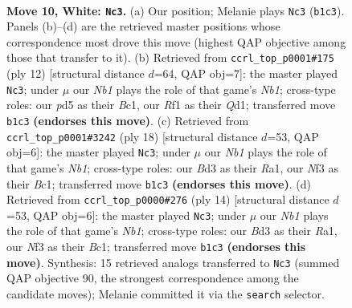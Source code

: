 \documentclass[11pt]{article}
\begin{document}
\clearpage

\begin{figure}[p]\centering
\begin{subfigure}{0.46\textwidth}\centering
\resizebox{\linewidth}{!}{%
\newchessgame
\chessboard[
  setfen={rnbq1rk1/pp3pp1/4pn2/3p3p/3P4/3B1NP1/PPP2PP1/RN1Q1RK1 w - - 0 10},
  showmover=false,
  pgfstyle=straightmove, color=movearrow, markmove={b1-c3}
]}
\caption{}
\end{subfigure}\hfill
\begin{subfigure}{0.46\textwidth}\centering
\resizebox{\linewidth}{!}{%
\newchessgame
\chessboard[
  setfen={rnbqk2r/pp2ppbp/5np1/3p4/3P4/5NP1/PP2PPBP/RNBQK2R w KQkq - 0 7},
  showmover=false,
  pgfstyle=straightmove, color=movearrow, markmove={b1-c3}
]}
\caption{}
\end{subfigure}
\\[4pt]
\begin{subfigure}{0.46\textwidth}\centering
\resizebox{\linewidth}{!}{%
\newchessgame
\chessboard[
  setfen={rnbq1rk1/pp2ppbp/5np1/3p4/3P4/5NP1/PP2PPBP/RNBQ1RK1 w - - 4 10},
  showmover=false,
  pgfstyle=straightmove, color=movearrow, markmove={b1-c3}
]}
\caption{}
\end{subfigure}\hfill
\begin{subfigure}{0.46\textwidth}\centering
\resizebox{\linewidth}{!}{%
\newchessgame
\chessboard[
  setfen={rnbq1rk1/pp2ppbp/5np1/3p4/3P4/5NP1/PP2PPBP/RNBQ1RK1 w - - 0 8},
  showmover=false,
  pgfstyle=straightmove, color=movearrow, markmove={b1-c3}
]}
\caption{}
\end{subfigure}
\caption{\textbf{Move 10, White: \texttt{Nc3}.} (a) Our position; Melanie plays \texttt{Nc3} (\texttt{b1c3}). Panels (b)--(d) are the retrieved master positions whose correspondence most drove this move (highest QAP objective among those that transfer to it). (b) Retrieved from \texttt{ccrl\_top\_p0001\#175} (ply 12) [structural distance $d$=64, QAP obj=7]: the master played \texttt{Nc3}; under $\mu$ our \emph{Nb1} plays the role of that game's \emph{Nb1}; cross-type roles: our \emph{p}d5 as their \emph{B}c1, our \emph{R}f1 as their \emph{Q}d1; transferred move \texttt{b1c3} \textbf{(endorses this move)}. (c) Retrieved from \texttt{ccrl\_top\_p0001\#3242} (ply 18) [structural distance $d$=53, QAP obj=6]: the master played \texttt{Nc3}; under $\mu$ our \emph{Nb1} plays the role of that game's \emph{Nb1}; cross-type roles: our \emph{B}d3 as their \emph{R}a1, our \emph{N}f3 as their \emph{B}c1; transferred move \texttt{b1c3} \textbf{(endorses this move)}. (d) Retrieved from \texttt{ccrl\_top\_p0000\#276} (ply 14) [structural distance $d$=53, QAP obj=6]: the master played \texttt{Nc3}; under $\mu$ our \emph{Nb1} plays the role of that game's \emph{Nb1}; cross-type roles: our \emph{B}d3 as their \emph{R}a1, our \emph{N}f3 as their \emph{B}c1; transferred move \texttt{b1c3} \textbf{(endorses this move)}. Synthesis: 15 retrieved analogs transferred to \texttt{Nc3} (summed QAP objective 90, the strongest correspondence among the candidate moves); Melanie committed it via the \texttt{search} selector.}
\label{fig:thought-m18}
\end{figure}
\end{document}
